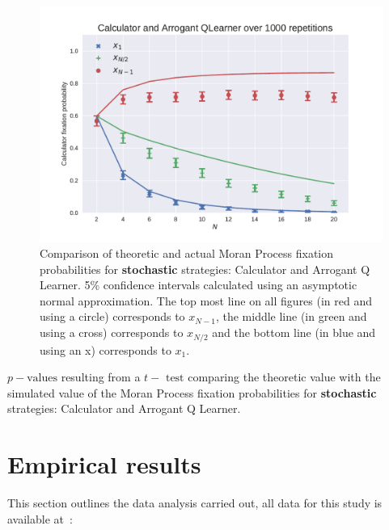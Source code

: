 \documentclass[10pt,journal]{IEEEtran}
\begin{document}
\begin{figure}[!hbtp]
    \centering
    \includegraphics[width=.95\columnwidth]{img/Calculator_v_Arrogant_QLearner.pdf}
    \caption{Comparison of theoretic and actual Moran Process
             fixation probabilities for \textbf{stochastic} strategies:
             Calculator and Arrogant Q Learner. 5\% confidence intervals calculated using an asymptotic
     normal approximation.
The top most line on all figures (in red and using a circle) corresponds to
\(x_{N-1}\), the middle line (in green and using a cross) corresponds to
\(x_{N/2}\) and the bottom line (in blue and using an x) corresponds to
\(x_{1}\).}
    \label{fig:comparison_stochastic}
\end{figure}

\begin{table}[!hbtp]
    \centering
    
    \caption{\(p-\text{values}\) resulting from a \(t-\text{ test}\) comparing the theoretic
        value with the simulated value of the Moran Process fixation
        probabilities for \textbf{stochastic} strategies: Calculator and
    Arrogant Q Learner.}
    \label{tab:comparison_stochastic}
\end{table}

\section{Empirical results}\label{sec:empirical_results}

This section outlines the data analysis carried out, all data for this study is
available at~\cite{data}:
\end{document}
